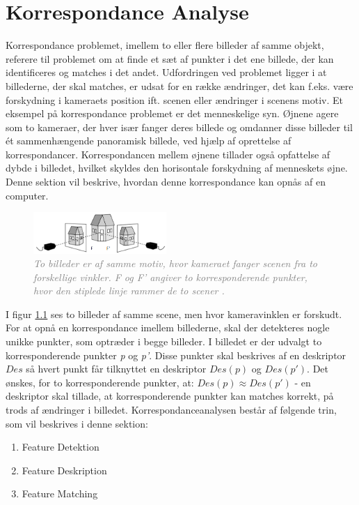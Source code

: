 \chapter{Korrespondance Analyse} \label{sec:Kor}
Korrespondance problemet, imellem to eller flere billeder af samme objekt, referere til problemet om at finde et sæt af punkter i det ene billede, der kan identificeres og matches i det andet.
Udfordringen ved problemet ligger i at billederne, der skal matches, er udsat for en række ændringer, det kan f.eks. være forskydning i kameraets position ift. scenen eller  ændringer i scenens motiv. Et eksempel på korrespondance problemet er det menneskelige syn. Øjnene agere som to kameraer, der hver især fanger deres billede og omdanner disse billeder til ét sammenhængende panoramisk billede, ved hjælp af oprettelse af korrespondancer. Korrespondancen mellem øjnene tillader også opfattelse af dybde i billedet, hvilket skyldes den horisontale forskydning af menneskets øjne. Denne sektion vil beskrive, hvordan denne korrespondance kan opnås af en computer.
\begin{figure}[H]
    \centering
    \includegraphics[width=0.45\textwidth]{fig/3.png}
     \vspace{-1em}
    \begin{center}    
       \caption{\textcolor{gray}{\footnotesize \textit{To billeder er af samme motiv, hvor kameraet fanger scenen fra to forskellige vinkler. F og F' angiver to korresponderende punkter, hvor den stiplede linje rammer de to scener \cite{kim}.}}}
    \label{fig:1}
     \end{center}
     \vspace{-2.5em}
  \end{figure} \noindent
I figur \ref{fig:1} ses to billeder af samme scene, men hvor kameravinklen er forskudt. For at opnå en korrespondance imellem billederne, skal der detekteres nogle unikke punkter, som optræder i begge billeder. I billedet er der udvalgt to korresponderende punkter \textit{p} og \textit{p'}. Disse punkter skal beskrives af en deskriptor $Des$ så hvert punkt får tilknyttet en deskriptor $Des(p)$ og $Des(p')$. Det ønskes, for to korresponderende punkter, at: $Des(p)\approx Des(p')$ - en deskriptor skal tillade, at korresponderende punkter kan matches korrekt, på trods af ændringer i billedet. Korrespondanceanalysen består af følgende trin, som vil beskrives i denne sektion:
\begin{enumerate}
\item{Feature Detektion}
\item{Feature Deskription}
\item{Feature Matching}
\end{enumerate}


